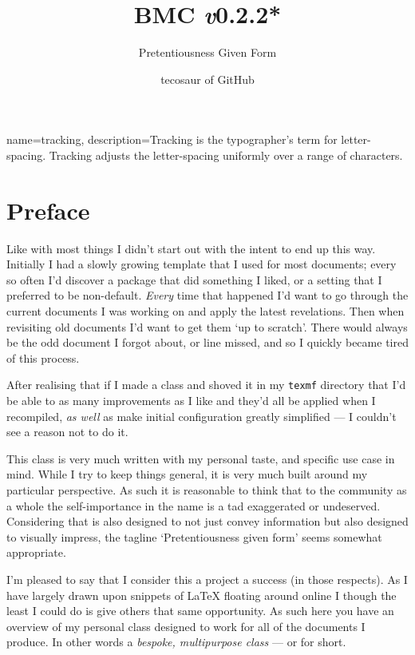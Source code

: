 \documentclass[solid,math,chem,code,plot,gloss]{bmc}
\title{\texorpdfstring{BMC \hfill \fontsize{1.35cm}{1.35cm}\fontseries{t}\selectfont \emph{v}0.2.2*}{BMC v0.2.2*}}
\subtitle{Pretentiousness Given Form}
\author{tecosaur \footnotesize \newline of GitHub}
\begin{document}
{
    name=tracking,
    description={Tracking is the typographer's term for letter-spacing. Tracking adjusts the letter-spacing uniformly over a range of characters.}
}

\maketitle

\section*{Preface}

\vspace{1cm}

Like with most things I didn't start out with the intent to end up this way.
Initially I had a slowly growing template that I used for most documents;
every so often I'd discover a package that did something I liked,
or a setting that I preferred to be non-default.
\emph{Every} time that happened I'd want to go through the current documents
I was working on and apply the latest revelations.
Then when revisiting old documents I'd want to get them `up to scratch'.
There would always be the odd document I forgot about, or line missed,
and so I quickly became tired of this process.

After realising that if I made a class and shoved it in my \verb|texmf|
directory that I'd be able to as many improvements as I like and they'd all
be applied when I recompiled, \emph{as well} as make initial configuration
greatly simplified --- I couldn't see a reason not to do it.

This class is very much written with my personal taste, and specific use case in mind.
While I try to keep things general, it is very much built around my particular perspective.
As such it is reasonable to think that to the community as a whole the
self-importance in the name is a tad exaggerated or undeserved.
Considering that is also designed to not just convey information but also
designed to visually impress, the tagline `Pretentiousness given form'
seems somewhat appropriate.

I'm pleased to say that I consider this a project a success (in those respects).
As I have largely drawn upon snippets of LaTeX floating around online
I though the least I could do is give others that same opportunity.
As such here you have an overview of my personal class
designed to work for all of the documents I produce.
In other words a \emph{bespoke, multipurpose class} --- or  for short.
\end{document}
